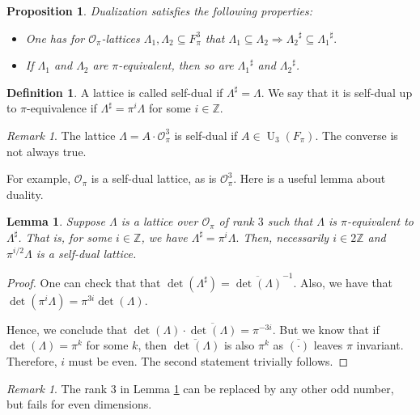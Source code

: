\documentclass{eptcs}
\newtheorem{lemma}[theorem]{Lemma}
\newtheorem{proposition}[theorem]{Proposition}
\theoremstyle{remark}
\newtheorem{remark}[theorem]{Remark}
\theoremstyle{definition}
\newtheorem{definition}[theorem]{Definition}
\DeclareMathOperator{\U}{U}
\newcommand{\dual}[1]{{#1}^{\sharp}}
\begin{document}
\begin{proposition}\label{le:dual_equivalence}
Dualization satisfies the following properties:
\begin{itemize}
\item One has for $\mathcal{O}_{\pi}$-lattices $\Lambda_{1},\Lambda_{2}\subseteq F_{\pi}^{3}$ that
$\Lambda_{1} \subseteq \Lambda_2 \Rightarrow \dual{ \Lambda_{2} }\subseteq \dual{\Lambda_{1}}.$
\item If $\Lambda_{1}$ and $\Lambda_{2}$ are $\pi$-equivalent, then so are $\dual{\Lambda_{1}}$ and $\dual{\Lambda_{2}}$.
\end{itemize}
\end{proposition}

\begin{definition}
A lattice is called self-dual if $\dual{\Lambda}= \Lambda$. 
We say that it is self-dual up to $\pi$-equivalence if $\dual{\Lambda} = \pi^{i} \Lambda$ for some $ i \in \mathbb{Z}$.
\end{definition}
\begin{remark}
The lattice $\Lambda = A \cdot \mathcal{O}_{\pi}^{3}$ is self-dual if $A \in \U_{3}(F_{\pi})$. The converse is not always true.
\end{remark}


For example, $\mathcal{O}_{{\pi}}$ is a self-dual lattice, as is $\mathcal{O}_{\pi}^{3}$.
Here is a useful lemma about duality.
\begin{lemma}
\label{le:dual_scaling}
Suppose $\Lambda$ is a lattice over $\mathcal{O}_{\pi}$ of rank $3$ such that 
$\Lambda$ is $\pi$-equivalent to $\dual{\Lambda}$. That is, 
for some $i \in \mathbb{Z}$, we have 
 $ \dual{\Lambda} = \pi^{i}\Lambda.$
Then, necessarily $i \in 2\mathbb{Z}$ and $\pi^{i/2} \Lambda$ is a self-dual lattice.
\end{lemma}
\begin{proof}
One can check that
that $\det(\dual{\Lambda}) = \overline{ \det(\Lambda) }^{-1}$. Also, we have that $\det(\pi^{i} \Lambda) = \pi^{3i} \det (\Lambda)$.

Hence, we conclude that $\det(\Lambda) \cdot \overline{\det({\Lambda})} = \pi^{-3i}$. But we know that if $\det(\Lambda) = \pi^{k}$ for some $k$, then $\overline{\det(\Lambda)}$ is also $\pi^{k}$ as $\overline{(\cdot)}$ leaves $\pi$ invariant. Therefore, $i$ must be even.
The second statement trivially follows.
\end{proof}
\begin{remark}
  The rank $3$ in Lemma \ref{le:dual_scaling} can be replaced by any other odd number, but fails for even dimensions.
\end{remark}
\end{document}
